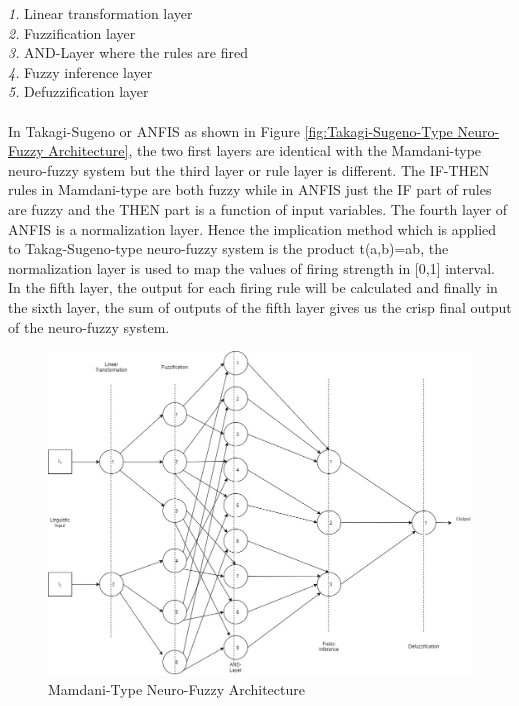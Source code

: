 \textit{1.} Linear transformation layer\\
\textit{2.} Fuzzification layer\\
\textit{3.} AND-Layer where the rules are fired\\
\textit{4.} Fuzzy inference layer\\
\textit{5.} Defuzzification layer\\\\
In Takagi-Sugeno or ANFIS as shown in Figure \ref{fig:Takagi-Sugeno-Type Neuro-Fuzzy Architecture}, the two first layers are identical with the Mamdani-type neuro-fuzzy system but the third layer or rule layer is different. The IF-THEN rules in Mamdani-type are both fuzzy while in ANFIS just the IF part of rules are fuzzy and the THEN part is a function of input variables. The fourth layer of ANFIS is a normalization layer. Hence the implication method which is applied to Takag-Sugeno-type neuro-fuzzy system is the product t(a,b)=ab, the normalization layer is used to map the values of firing strength in [0,1] interval.\\ In the fifth layer, the output for each firing rule will be calculated and finally in the sixth layer, the sum of outputs of the fifth layer gives us the crisp final output of the neuro-fuzzy system.\\
\begin{figure}[H]
    \centering
    \includegraphics[width=14cm]{gfx/Untitled_Diagram.png}
    \captionsetup{justification=centering}
    \caption{Mamdani-Type Neuro-Fuzzy Architecture}
    \label{fig:Mamdani-Type Neuro-Fuzzy Architecture}
\end{figure}

